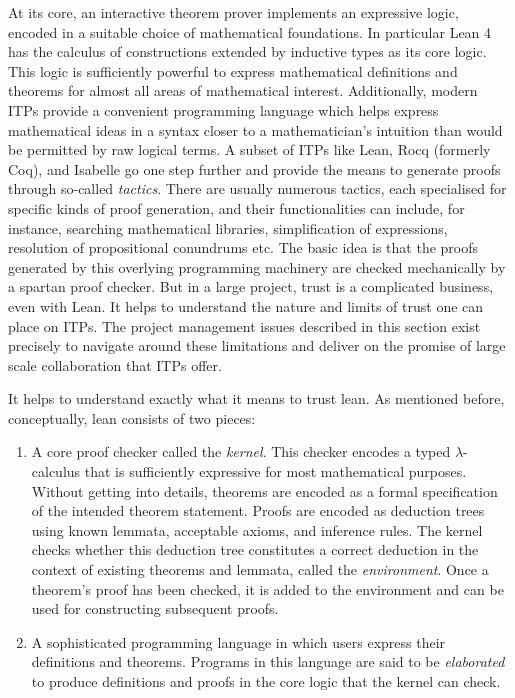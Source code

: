 At its core, an interactive theorem prover implements an expressive logic, encoded in a suitable choice of mathematical foundations. In particular Lean 4 has the calculus of constructions extended by inductive types as its core logic. This logic is sufficiently powerful to express mathematical definitions and theorems for almost all areas of mathematical interest. Additionally, modern ITPs provide a convenient programming language which helps express mathematical ideas in a syntax closer to a mathematician's intuition than would be permitted by raw logical terms. A subset of ITPs like Lean, Rocq (formerly Coq), and Isabelle go one step further and provide the means to generate proofs through so-called \emph{tactics}. There are usually numerous tactics, each specialised for specific kinds of proof generation, and their functionalities can include, for instance, searching mathematical libraries, simplification of expressions, resolution of propositional conundrums etc. The basic idea is that the proofs generated by this overlying programming machinery are checked mechanically by a spartan proof checker. But in a large project, trust is a complicated business, even with Lean. It helps to understand the nature and limits of trust one can place on ITPs. The project management issues described in this section exist precisely to navigate around these limitations and deliver on the promise of large scale collaboration that ITPs offer.

It helps to understand exactly what it means to trust lean. As mentioned before, conceptually, lean consists of two pieces:

\begin{enumerate}
    \item A core proof checker called the \emph{kernel}. This checker encodes a typed $\lambda$-calculus that is sufficiently expressive for most mathematical purposes. Without getting into details, theorems are encoded as a formal specification of the intended theorem statement. Proofs are encoded as deduction trees using known lemmata, acceptable axioms, and inference rules. The kernel checks whether this deduction tree constitutes a correct deduction in the context of existing theorems and lemmata, called the \emph{environment}. Once a theorem's proof has been checked, it is added to the environment and can be used for constructing subsequent proofs.
    \item A sophisticated programming language in which users express their definitions and theorems. Programs in this language are said to  be \emph{elaborated} to produce definitions and proofs in the core logic that the kernel can check.
\end{enumerate}

